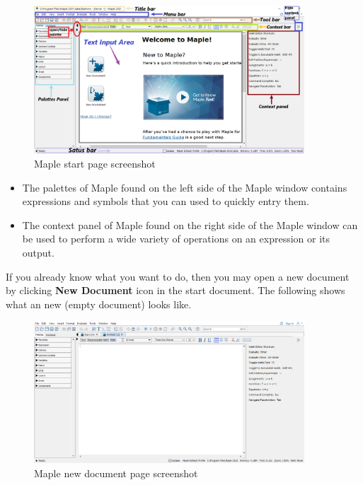 \documentclass[
  12pt]{elegantbook}
\begin{document}
\begin{figure}
\centering
\includegraphics[width=0.9\textwidth,height=\textheight]{figs/Maple-Start.png}
\caption{Maple start page screenshot}
\end{figure}

\begin{itemize}
\item
  The palettes of Maple found on the left side of the Maple window contains expressions and
  symbols that you can used to quickly entry them.
\item
  The context panel of Maple found on the right side of the Maple window can be used to perform a wide variety of operations on an expression or its output.
\end{itemize}

If you already know what you want to do, then you may open a new document by clicking \textbf{New Document} icon in the start document. The following shows what an new (empty document) looks like.

\begin{figure}
\centering
\includegraphics[width=0.9\textwidth,height=\textheight]{figs/New-Document.png}
\caption{Maple new document page screenshot}
\end{figure}
\end{document}
